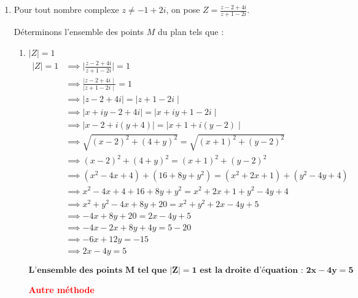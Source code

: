 \documentclass[a4paper,12pt]{article}
\begin{document}
\begin{enumerate}
\item Pour tout nombre complexe $z \neq -1 + 2i$, on pose $Z = \frac{z - 2 + 4i}{z + 1 - 2i}$.

Déterminons l'ensemble des points $M$ du plan tels que :

\begin{enumerate}
        \item $|Z| = 1$\\
        	$\begin{aligned}
        	|Z| = 1 &\implies \mid \frac{z - 2 + 4i}{z + 1 - 2i} \mid = 1\\
        					&\implies \frac{\mid z - 2 + 4i \mid}{\mid z + 1 - 2i \mid} = 1\\
        					&\implies \mid z - 2 + 4i \mid = \mid z + 1 - 2i \mid\\
        					&\implies \mid x+iy - 2 + 4i \mid = \mid x+iy + 1 - 2i \mid\\
                            &\implies \mid x-2+i(y+4) \mid = \mid x+1 +i(y-2) \mid\\
        					&\implies \sqrt{ (x-2)^{2} + (4+y)^{2} } = \sqrt{ (x+1)^{2} + (y - 2)^{2} }\\
                            &\implies (x-2)^{2} + (4+y)^{2}=(x+1)^{2} + (y - 2)^{2}\\
                            &\implies (x^2 - 4x + 4) + (16 + 8y + y^2) = (x^2 + 2x + 1) + (y^2 - 4y + 4)\\
                            &\implies x^2 - 4x + 4 + 16 + 8y + y^2 = x^2 + 2x + 1 + y^2 - 4y + 4\\
                            &\implies  x^2 + y^2 - 4x + 8y + 20 = x^2 + y^2 + 2x - 4y + 5\\
                            &\implies -4x + 8y + 20 = 2x - 4y + 5\\
                            &\implies -4x - 2x + 8y + 4y = 5 - 20\\
                            &\implies -6x + 12y = -15\\
                            &\implies 2x - 4y = 5
        	\end{aligned}$
        	
\begin{resultbox}
    \[
    \mathbf{\text{L'ensemble des points $M$ tel que $|Z| = 1$ est la droite d'équation : $2x - 4y = 5$}}
    \]
\end{resultbox}

\textcolor{red}{\textbf{Autre méthode}}


\end{enumerate}
\end{enumerate}
\end{document}
